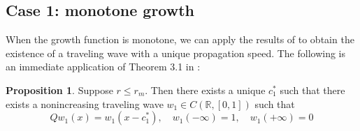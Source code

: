 \documentclass{article}
\theoremstyle{definition}
\newtheorem{proposition}[theorem]{Proposition}
\numberwithin{equation}{section}
\begin{document}



\subsection{Case 1: monotone growth}

When the growth function is monotone, we can apply the results of \cite{LO22} to obtain the existence of a traveling wave with a unique propagation speed. The following is an immediate application of Theorem 3.1 in \cite{LO22}:

\begin{proposition}
Suppose $r\leq r_m$.
Then there exists a unique $c_1^*$ such that there exists a nonincreasing traveling wave $w_1 \in C(\mathbb{R},[0,1])$ such that
$$ Qw_1(x)=w_1(x-c_1^*), \quad w_1(-\infty)=1, \quad w_1(+\infty)=0 $$
\end{proposition}
\end{document}
